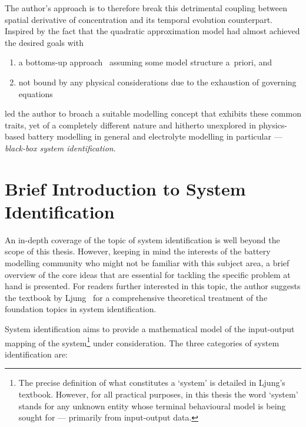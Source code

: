The author's  approach is to  therefore break this detrimental  coupling between
spatial  derivative of  concentration  and its  temporal evolution  counterpart.
Inspired by the fact that the  quadratic approximation model had almost achieved
the desired goals with
\begin{enumerate}[label=\emph{\alph*})]
    \item a bottoms-up approach \ie~assuming some model structure a~priori, and
    \item not bound by any physical considerations due to the exhaustion of governing equations
\end{enumerate}
led  the author  to  broach a  suitable modelling  concept  that exhibits  these
common  traits, yet  of a  completely different  nature and  hitherto unexplored
in  physics-based battery  modelling  in general  and  electrolyte modelling  in
particular --- \emph{black-box system identification}.

\section{Brief Introduction to System Identification}\label{subsec:introsysid}

An in-depth  coverage of the topic  of system identification is  well beyond the
scope of  this thesis.  However, keeping  in mind the  interests of  the battery
modelling community  who might not be  familiar with this subject  area, a brief
overview of the core ideas that  are essential for tackling the specific problem
at hand is  presented. For readers further interested in  this topic, the author
suggests the textbook by  Ljung~\cite{Ljung1999} for a comprehensive theoretical
treatment of the foundation topics in system identification.

System identification aims  to provide a mathematical model  of the input-output
mapping  of the  system\footnote{The precise  definition of  what constitutes  a
`system' is detailed  in Ljung's textbook. However, for  all practical purposes,
in this  thesis the word `system'  stands for any unknown  entity whose terminal
behavioural model  is being  sought for ---  primarily from  input-output data.}
under consideration. The three categories of system identification are:

